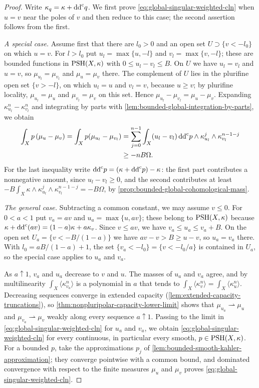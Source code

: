 \begin{proof}
Write $\kappa_q=\kappa+\mathrm{dd}^{\mathrm{c}} q$. We first prove \eqref{eq:global-singular-weighted-cln} when $u=v$ near the poles of $v$ and then reduce to this case; the second assertion follows from the first.

\emph{A special case.} Assume first that there are $l_0>0$ and an open set $U\supset\{v<-l_0\}$ on which $u=v$. For $l>l_0$ put $u_l=\max\{u,-l\}$ and $v_l=\max\{v,-l\}$; these are bounded functions in $\mathrm{PSH}(X,\kappa)$ with $0\leq u_l-v_l\leq B$. On $U$ we have $u_l=v_l$ and $u=v$, so $\mu_{u_l}=\mu_{v_l}$ and $\mu_u=\mu_v$ there. The complement of $U$ lies in the plurifine open set $\{v>-l\}$, on which $u_l=u$ and $v_l=v$, because $u\geq v$; by plurifine locality, $\mu_{u_l}=\mu_u$ and $\mu_{v_l}=\mu_v$ on this set. Hence $\mu_{u_l}-\mu_{v_l}=\mu_u-\mu_v$. Expanding $\kappa_{u_l}^n-\kappa_{v_l}^n$ and integrating by parts with \cref{lem:bounded-global-integration-by-parts}, we obtain
\[
 \begin{split}
 \int_Xp\,(\mu_u-\mu_v)=\int_Xp(\mu_{u_l}-\mu_{v_l})
  &=\sum_{j=0}^{n-1}\int_X(u_l-v_l)\,\mathrm{dd}^{\mathrm{c}} p
                  \wedge\kappa_{u_l}^{j}\wedge\kappa_{v_l}^{n-1-j}\\
  &\geq-nB\Omega.
 \end{split}
\]
For the last inequality write $\mathrm{dd}^{\mathrm{c}} p=(\kappa+\mathrm{dd}^{\mathrm{c}} p)-\kappa$: the first part contributes a nonnegative amount, since $u_l-v_l\geq0$, and the second contributes at least $-B\int_X\kappa\wedge\kappa_{u_l}^j\wedge\kappa_{v_l}^{n-1-j}=-B\Omega$, by \cref{prop:bounded-global-cohomological-mass}.

\emph{The general case.} Subtracting a common constant, we may assume $v\leq0$. For $0<a<1$ put $v_a=av$ and $u_a=\max\{u,av\}$; these belong to $\mathrm{PSH}(X,\kappa)$ because $\kappa+\mathrm{dd}^{\mathrm{c}}(av)=(1-a)\kappa+a\kappa_v$. Since $v\leq av$, we have $v_a\leq u_a\leq v_a+B$. On the open set $U_a=\{v<-B/(1-a)\}$ we have $av-v>B\geq u-v$, so $u_a=v_a$ there. With $l_0=aB/(1-a)+1$, the set $\{v_a<-l_0\}=\{v<-l_0/a\}$ is contained in $U_a$, so the special case applies to $u_a$ and $v_a$.

As $a\uparrow1$, $v_a$ and $u_a$ decrease to $v$ and $u$. The masses of $u_a$ and $v_a$ agree, and by multilinearity $\int_X\langle\kappa_{v_a}^n\rangle$ is a polynomial in $a$ that tends to $\int_X\langle\kappa_v^n\rangle=\int_X\langle\kappa_u^n\rangle$. Decreasing sequences converge in extended capacity (\cref{lem:extended-capacity-truncations}), so \cref{thm:nonpluripolar-capacity-lower-limit} shows that $\mu_{u_a}\rightharpoonup\mu_u$ and $\mu_{v_a}\rightharpoonup\mu_v$ weakly along every sequence $a\uparrow1$. Passing to the limit in \eqref{eq:global-singular-weighted-cln} for $u_a$ and $v_a$, we obtain \eqref{eq:global-singular-weighted-cln} for every continuous, in particular every smooth, $p\in\mathrm{PSH}(X,\kappa)$. For a bounded $p$, take the approximations $p_j$ of \cref{lem:bounded-smooth-kahler-approximation}; they converge pointwise with a common bound, and dominated convergence with respect to the finite measures $\mu_u$ and $\mu_v$ proves \eqref{eq:global-singular-weighted-cln}.


\end{proof}
